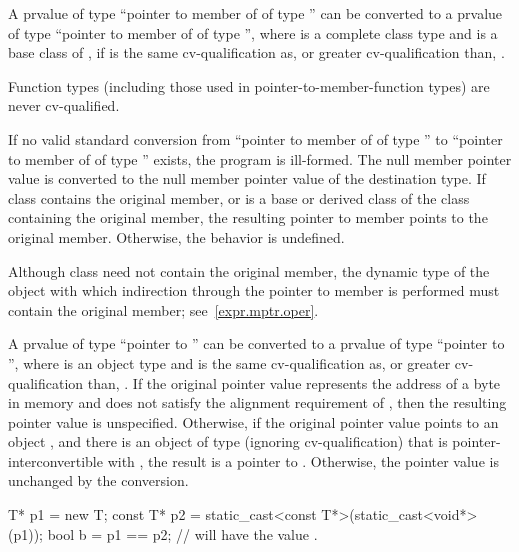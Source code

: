 \pnum
{}%
A prvalue of type ``pointer to member of  of type 
'' can be converted to a prvalue of type ``pointer to member of
 of type  '', where
 is a complete class type and
 is a base class of ,
if  is the same cv-qualification
as, or greater cv-qualification than, .
\begin{note}
Function types (including those used in pointer-to-member-function types)
are never cv-qualified.
\end{note}
If no valid standard conversion
from ``pointer to member of  of type ''
to ``pointer to member of  of type ''
exists, the program is ill-formed.
The null member pointer value is converted to the null
member pointer value of the destination type. If class 
contains the original member, or is a base or derived class of the class
containing the original member, the resulting pointer to member points
to the original member. Otherwise, the behavior is undefined.
\begin{note}
Although class  need not contain the original member, the
dynamic type of the object with which indirection through the pointer
to member is performed must contain the original member;
see~\ref{expr.mptr.oper}.
\end{note}

\pnum
A prvalue of type ``pointer to  '' can be
converted to a prvalue of type ``pointer to  '',
where  is an object type and  is the same
cv-qualification as, or greater cv-qualification than, .
If the original pointer value represents the address
 of a byte in memory and
 does not satisfy the alignment requirement of ,
then the resulting pointer value is unspecified.
Otherwise, if the original pointer value points to an object ,
and there is an object  of type  (ignoring cv-qualification)
that is pointer-interconvertible with ,
the result is a pointer to .
Otherwise, the pointer value is unchanged by the conversion.
\begin{example}
\begin{codeblock}
T* p1 = new T;
const T* p2 = static_cast<const T*>(static_cast<void*>(p1));
bool b = p1 == p2;  //  will have the value .
\end{codeblock}
\end{example}

